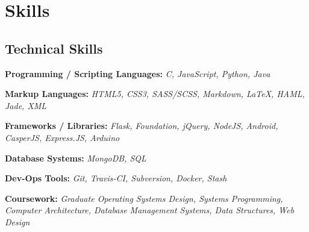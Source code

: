 \documentclass[12pt,a4paper,sans]{moderncv}        %
\begin{document}
\section{Skills}

\vspace{5pt}

\subsection{Technical Skills}

\vspace{5pt}

\begin{itemize}

\item{\textbf{Programming / Scripting Languages:} \textit{C, JavaScript, Python, Java}

\small{}}

\vspace{6pt}

\item{\textbf{Markup Languages:}\textit{ HTML5, CSS3, SASS/SCSS, Markdown, LaTeX, HAML, Jade, XML }

\vspace{3pt}

\small{}}

\vspace{6pt}

\item{\textbf{Frameworks / Libraries:}\textit{ Flask, Foundation, jQuery, NodeJS, Android, CasperJS, Express.JS, Arduino}

\vspace{3pt}
\item{\textbf{Database Systems:}\textit{ MongoDB, SQL} }

\vspace{3pt}

\small{}}

\vspace{6pt}

\item{\textbf{Dev-Ops Tools:}\textit{ Git, Travis-CI, Subversion, Docker, Stash}

\vspace{3pt}

\small{}}

\vspace{6pt}

\item{\textbf{Coursework:}\textit{ Graduate Operating Systems Design, Systems Programming, Computer Architecture, Database Management Systems, Data Structures, Web Design} }

\vspace{3pt}

\small{}

\vspace{6pt}

\end{itemize}
\end{document}
